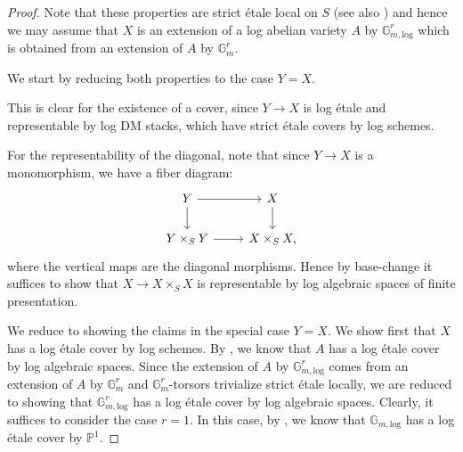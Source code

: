 \documentclass[11pt]{amsart}
\theoremstyle{definition}
\theoremstyle{remark}
\def\log{\mathrm{log}}
\begin{document}
\begin{proof}
	Note that these properties are strict étale local on $S$ (see also
	\cite[Theorem 1.1 (3)]{fortman2025descentalgebraicstacks})
	and hence
	we may assume that $X$ is an extension of a log abelian variety
	$A$ by $\mathbb{G}_{m,\log}^{r}$ which is obtained from an
	extension of $A$ by $\mathbb{G}_{m}^{r}$.

	We start by reducing both properties to the case $Y=X$.

	This is clear for the existence of a cover, since $Y\to X$
	is log étale and representable by log DM stacks, which have
	strict étale covers by log schemes.

	For the representability of the diagonal, note that since
	$Y\to X$ is a monomorphism, we have a fiber diagram:
	$$\begin{tikzcd}
		Y\arrow[r]\arrow[d]&X\arrow[d]\\
		Y\times_S Y\arrow[r]&X\times_S X,
	\end{tikzcd}$$
	where the vertical maps are the diagonal morphisms. Hence
	by base-change it suffices to show that $X\to X\times_S X$ is
	representable by log algebraic spaces of finite presentation.

	We reduce to showing the claims in the special case $Y=X$.
	We show first that $X$ has a log étale cover by log schemes.
	By \cite[Theorem 10.4]{LogarithmicAbeKajiwa2015}, we know that $A$ has a log étale cover by log algebraic spaces. Since
	the extension of $A$ by $\mathbb{G}_{m,\log}^{r}$ comes from an extension
	of $A$ by $\mathbb{G}_{m}^{r}$ and $\mathbb{G}_{m}^{r}$-torsors trivialize
	strict étale locally, we are reduced to showing that $\mathbb{G}_{m,\log}^{r}$
	has a log étale cover by log algebraic spaces. Clearly, it suffices to consider the case
	$r=1$. In this case, by \cite[Lemma 2.2.7.3 (2)]{TheLogarithmicMolcho2022},
	we know that $\mathbb{G}_{m,\log}$ has a log étale cover by
	$\mathbb{P}^{1}$.


\end{proof}
\end{document}
